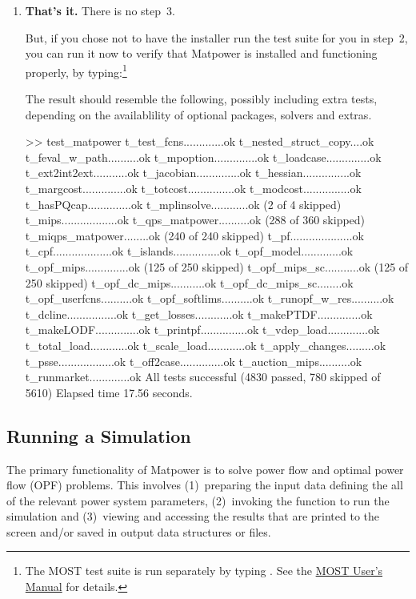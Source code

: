 \documentclass[12pt]{article}
\newcommand{\matpower}[0]{{\sc Matpower}}
\newcommand{\most}[0]{{MOST}}
\newcommand{\mostver}[0]{1.0}
\newcommand{\code}[1]{{\relsize{-0.5}{\tt{{#1}}}}}  %
\newcommand{\mostmanurl}[0]{http://www.pserc.cornell.edu/matpower/docs/MOST-manual-\mostver.pdf}
\newcommand{\mostman}[0]{\href{\mostmanurl}{\most{} User's Manual}}
\numberwithin{equation}{section}
\numberwithin{table}{section}
\numberwithin{figure}{section}
\begin{document}
\begin{enumerate}
\item {\bf That's it.} There is no step~3.

    But, if you chose not to have the installer run the test suite for
    you in step~2, you can run it now to verify that \matpower{} is
    installed and functioning properly, by typing:\footnote{The \most{} test suite is run separately by typing \code{test\_most}. See the \mostman{} for details.}

            \code{~~~test\_matpower}

    The result should resemble the following, possibly including extra tests, depending on the availablility of optional packages, solvers and extras.


\clearpage
\begin{Code}
>> test_matpower
t_test_fcns.............ok
t_nested_struct_copy....ok
t_feval_w_path..........ok
t_mpoption..............ok
t_loadcase..............ok
t_ext2int2ext...........ok
t_jacobian..............ok
t_hessian...............ok
t_margcost..............ok
t_totcost...............ok
t_modcost...............ok
t_hasPQcap..............ok
t_mplinsolve............ok (2 of 4 skipped)
t_mips..................ok
t_qps_matpower..........ok (288 of 360 skipped)
t_miqps_matpower........ok (240 of 240 skipped)
t_pf....................ok
t_cpf...................ok
t_islands...............ok
t_opf_model.............ok
t_opf_mips..............ok (125 of 250 skipped)
t_opf_mips_sc...........ok (125 of 250 skipped)
t_opf_dc_mips...........ok
t_opf_dc_mips_sc........ok
t_opf_userfcns..........ok
t_opf_softlims..........ok
t_runopf_w_res..........ok
t_dcline................ok
t_get_losses............ok
t_makePTDF..............ok
t_makeLODF..............ok
t_printpf...............ok
t_vdep_load.............ok
t_total_load............ok
t_scale_load............ok
t_apply_changes.........ok
t_psse..................ok
t_off2case..............ok
t_auction_mips..........ok
t_runmarket.............ok
All tests successful (4830 passed, 780 skipped of 5610)
Elapsed time 17.56 seconds.
\end{Code}
\end{enumerate}

\subsection{Running a Simulation}
\label{sec:runsimulation}

The primary functionality of \matpower{} is to solve power flow and optimal power flow (OPF) problems. This involves (1)~preparing the input data defining the all of the relevant power system parameters, (2)~invoking the function to run the simulation and (3)~viewing and accessing the results that are printed to the screen and/or saved in output data structures or files.
\end{document}
